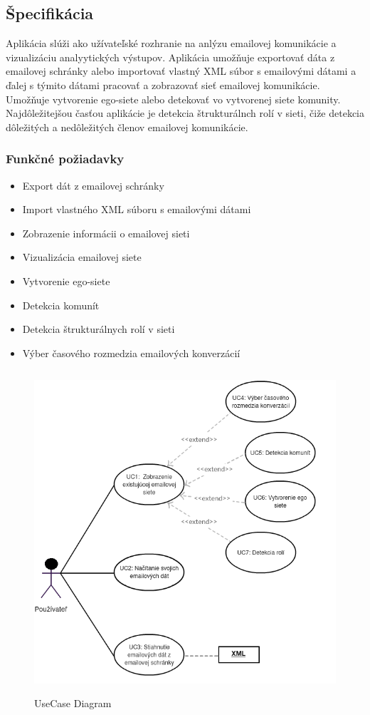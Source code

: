 \documentclass[slovak,master,public,dept460,male,cpdeclaration,oneside]{diploma}
\begin{document}
\subsection{Špecifikácia}
Aplikácia slúži ako užívateľské rozhranie na anlýzu emailovej komunikácie a vizualizáciu analyytických výstupov. Aplikácia umožňuje exportovať dáta z emailovej schránky alebo importovať vlastný XML súbor s emailovými dátami a ďalej s týmito dátami pracovať a zobrazovať sieť emailovej komunikácie. Umožňuje vytvorenie ego-siete alebo detekovať vo vytvorenej siete komunity. Najdôležitejšou časťou aplikácie je detekcia štrukturálnch rolí v sieti, čiže detekcia dôležitých a nedôležitých členov emailovej komunikácie. 


\subsubsection{Funkčné požiadavky}
\begin{itemize}
\item Export dát z emailovej schránky
\item Import vlastného XML súboru s emailovými dátami
\item Zobrazenie informácii o emailovej sieti
\item Vizualizácia emailovej siete
\item Vytvorenie ego-siete
\item Detekcia komunít
\item Detekcia štrukturálnych rolí v sieti
\item Výber časového rozmedzia emailových konverzácií
\end{itemize}


\begin{figure}[H]
\centering
\includegraphics[width=12cm, height=12cm]{figures/diagram_usecase}
\caption{UseCase Diagram}
\end{figure}
\end{document}
